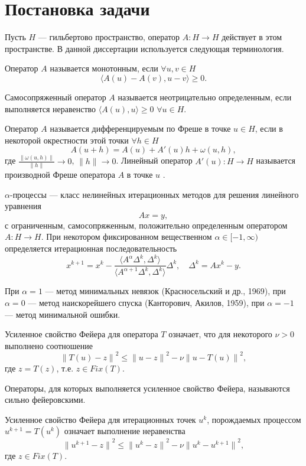 \section{Постановка задачи}
Пусть $H$ --- гильбертово пространство, оператор $A: H \to H$ действует в этом пространстве. В данной диссертации используется следующая терминология.
\begin{definition}
	Оператор $A$ называется монотонным, если $\forall u,v\in H$ $$\langle A(u)-A(v), u-v\rangle \geqslant 0.$$
\end{definition}
\begin{definition}
	Самосопряженный оператор $A$ называется неотрицательно определенным, если выполняется неравенство $\langle A(u), u \rangle \geqslant 0$ $\forall u\in H$.
\end{definition}
\begin{definition}
	Оператор $A$ называется дифференцируемым по Фреше в точке $u\in H$, если в некоторой окрестности этой точки $\forall h\in H$
	$$A(u+h)=A(u)+A'(u)h+\omega(u,h),$$
	где $\frac{\|\omega(u,h)\|}{\|h\|}\to 0$, $\|h\|\to 0$.
	Линейный оператор $A'(u):H \to H$ называется производной Фреше оператора $A$ в точке $u$ .
\end{definition}
\begin{definition}
	$\alpha$-процессы --- класс нелинейных итерационных методов для решения линейного уравнения
	$$Ax=y,$$
	с ограниченным, самосопряженным, положительно определенным оператором $A:H\to H$. При некотором фиксированном вещественном $\alpha \in [-1, \infty)$ определяется итерационная последовательность
		$$x^{k+1}=x^k-\frac{\langle A^\alpha\Delta^k, \Delta^k \rangle}{\langle A^{\alpha +1}\Delta^k, \Delta^k\rangle}\Delta^k,\quad \Delta^k=Ax^k-y.$$
\end{definition}
При $\alpha=1$ --- метод минимальных невязок (Красносельский и др., 1969), при $\alpha=0$ --- метод наискорейшего спуска (Канторович, Акилов, 1959), при $\alpha=-1$ --- метод минимальной ошибки.
\begin{definition}
	Усиленное свойство Фейера \cite{VasEre2009} для оператора $T$ означает, что для некоторого $\nu>0$ выполнено соотношение
	\begin{equation}\label{fejer_prop_uni}
	{\|T(u)-z\|}^2\le{\|u-z\|}^2-\nu{\|u-T(u)\|}^2,
	\end{equation}
	где $z=T(z)$, т.е. $z\in Fix(T)$. 
\end{definition}
Операторы, для которых выполняется усиленное свойство Фейера, называются сильно фейеровскими.
\begin{definition}
	Усиленное свойство Фейера для итерационных точек $u^k$, порождаемых процессом $u^{k+1}=T(u^k)$ означает выполнение неравенства
	\begin{equation}\label{fejer_prop_it}
	{\|u^{k+1}-z\|}^2\le{\|u^k-z\|}^2-\nu{\|u^k-u^{k+1}\|}^2,
	\end{equation}
	где $z\in Fix(T)$.
\end{definition}
